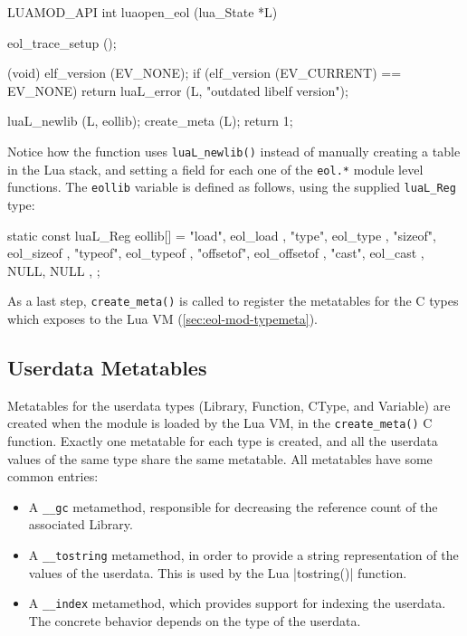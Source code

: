 \begin{ccode}
LUAMOD_API int
luaopen_eol (lua_State *L)
{
  eol_trace_setup ();

  (void) elf_version (EV_NONE);
  if (elf_version (EV_CURRENT) == EV_NONE)
    return luaL_error (L, "outdated libelf version");

  luaL_newlib (L, eollib);
  create_meta (L);
  return 1;
}
\end{ccode}

Notice how the function uses \verb|luaL_newlib()| instead of manually creating
a table in the Lua stack, and setting a field for each one of the \verb|eol.*|
module level functions. The \verb|eollib| variable is defined as follows,
using the supplied \verb|luaL_Reg| type:

\begin{ccode}
static const luaL_Reg eollib[] = {
  { "load",     eol_load     },
  { "type",     eol_type     },
  { "sizeof",   eol_sizeof   },
  { "typeof",   eol_typeof   },
  { "offsetof", eol_offsetof },
  { "cast",     eol_cast     },
  { NULL, NULL },
};
\end{ccode}

As a last step, \verb|create_meta()| is called to register the metatables for
the C types which \Eol* exposes to the Lua VM (\vref{sec:eol-mod-typemeta}).


\subsection{Userdata Metatables}
  \label{sec:eol-mod-typemeta}

Metatables for the userdata types (\textsf{Library}, \textsf{Function},
\textsf{CType}, and \textsf{Variable}) are created when the \Eol*
module is loaded by the Lua VM, in the \verb|create_meta()| C function.
Exactly one metatable for each type is created, and all the userdata values of the same
type share the same metatable. All metatables have some common entries:

\begin{itemize}

  \item A \verb|__gc| metamethod, responsible for decreasing the reference
  count of the associated \textsf{Library}.

  \item A \verb|__tostring| metamethod, in order to provide a string
  representation of the values of the userdata. This is used by the Lua
  \Mlua|tostring()| function.

  \item A \verb|__index| metamethod, which provides support for indexing the
  userdata. The concrete behavior depends on the type of the userdata.

\end{itemize}

